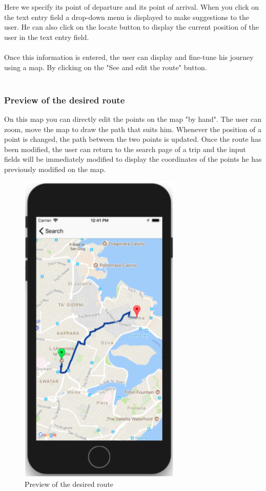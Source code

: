 Here we specify its point of departure and its point of arrival. When you click on the text entry field a drop-down menu is displayed to make suggestions to the user. He can also click on the locate button to display the current position of the user in the text entry field.
\\\\
Once this information is entered, the user can display and fine-tune his journey using a map. By clicking on the "See and edit the route" button.
\\\\

\subsubsection{Preview of the desired route}

On this map you can directly edit the points on the map "by hand". The user can zoom, move the map to draw the path that suits him. Whenever the position of a point is changed, the path between the two points is updated. Once the route has been modified, the user can return to the search page of a trip and the input fields will be immediately modified to display the coordinates of the points he has previously modified on the map.

\begin{figure}[h!]
\begin{center}
\includegraphics[scale = 0.3]{diagrams/PreviewRoute.png} 
\end{center}
\caption{Preview of the desired route}
\end{figure}

